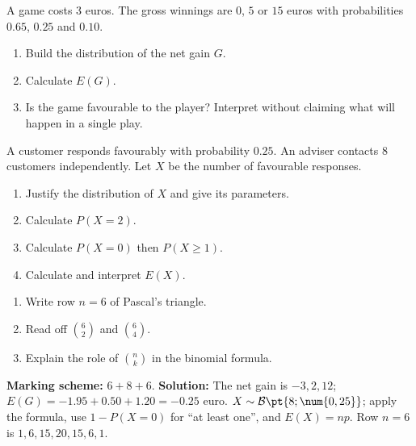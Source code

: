 \begin{exercise}
A game costs $3$ euros. The gross winnings are $0$, $5$ or $15$ euros with probabilities $\num{0,65}$, $\num{0,25}$ and $\num{0,10}$.
\begin{enumerate}
\item Build the distribution of the net gain $G$.
\item Calculate $E(G)$.
\item Is the game favourable to the player? Interpret without claiming what will happen in a single play.
\end{enumerate}
\end{exercise}
\begin{exercise}
A customer responds favourably with probability $\num{0,25}$. An adviser contacts $8$ customers independently. Let $X$ be the number of favourable responses.
\begin{enumerate}
\item Justify the distribution of $X$ and give its parameters.
\item Calculate $P(X=2)$.
\item Calculate $P(X=0)$ then $P(X\geq1)$.
\item Calculate and interpret $E(X)$.
\end{enumerate}
\end{exercise}
\begin{exercise}
\begin{enumerate}
\item Write row $n=6$ of Pascal's triangle.
\item Read off $\binom62$ and $\binom64$.
\item Explain the role of $\binom nk$ in the binomial formula.
\end{enumerate}
\end{exercise}
\begin{solution}\textbf{Marking scheme:} $6+8+6$. \textbf{Solution:} The net gain is $-3,2,12$; $E(G)=-\num{1,95}+\num{0,50}+\num{1,20}=-\num{0,25}$ euro. $X\sim\mathcal B\pt{8;\num{0,25}}$; apply the formula, use $1-P(X=0)$ for ``at least one'', and $E(X)=np$. Row $n=6$ is $1,6,15,20,15,6,1$.\end{solution}
